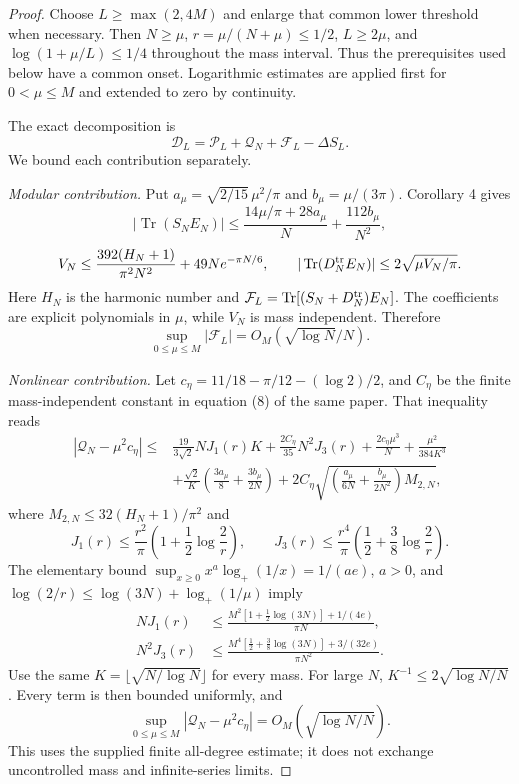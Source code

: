 \documentclass[11pt,a4paper]{article}
\theoremstyle{definition}\newtheorem{definition}[theorem]{Definition}
\begin{document}
\begin{proof}
Choose $L\ge\max(2,4M)$ and enlarge that common lower threshold when necessary. Then $N\ge\mu$, $r=\mu/(N+\mu)\le1/2$, $L\ge2\mu$, and $\log(1+\mu/L)\le1/4$ throughout the mass interval. Thus the prerequisites used below have a common onset. Logarithmic estimates are applied first for $0<\mu\le M$ and extended to zero by continuity.

The exact decomposition is
\[
\mathcal D_L=\mathcal P_L+\mathcal Q_N+\mathcal F_L-\Delta S_L.
\]
We bound each contribution separately.

\emph{Modular contribution.} Put $a_\mu=\sqrt{2/15}\,\mu^2/\pi$ and $b_\mu=\mu/(3\pi)$. Corollary 4 gives
\[
|\operatorname{Tr}(S_NE_N)|\le
\frac{14\mu/\pi+28a_\mu}{N}+\frac{112b_\mu}{N^2},
\]
\[
V_N\le\frac{392(H_N+1)}{\pi^2N^2}+49Ne^{-\pi N/6},\qquad
|\operatorname{Tr}(D_N^{\rm tr}E_N)|\le2\sqrt{\mu V_N/\pi}.
\]
Here $H_N$ is the harmonic number and $\mathcal F_L=\operatorname{Tr}[(S_N+D_N^{\rm tr})E_N]$. The coefficients are explicit polynomials in $\mu$, while $V_N$ is mass independent. Therefore
\[
\sup_{0\le\mu\le M}|\mathcal F_L|=O_M(\sqrt{\log N}/N).
\]

\emph{Nonlinear contribution.} Let $c_\eta=11/18-\pi/12-(\log2)/2$, and $C_\eta$ be the finite mass-independent constant in equation (8) of the same paper. That inequality reads
\begin{align*}
|\mathcal Q_N-\mu^2c_\eta|\le{}&
\frac{19}{3\sqrt2}NJ_1(r)K+\frac{2C_\eta}{35}N^2J_3(r)
+\frac{2c_\eta\mu^3}{N}+\frac{\mu^2}{384K^3}\\
&+\frac{\sqrt2}{K}\left(\frac{3a_\mu}{8}+\frac{3b_\mu}{2N}\right)
+2C_\eta\sqrt{\left(\frac{a_\mu}{6N}+\frac{b_\mu}{2N^2}\right)M_{2,N}},
\end{align*}
where $M_{2,N}\le32(H_N+1)/\pi^2$ and
\[
J_1(r)\le\frac{r^2}{\pi}\left(1+\frac12\log\frac2r\right),\qquad
J_3(r)\le\frac{r^4}{\pi}\left(\frac12+\frac38\log\frac2r\right).
\]
The elementary bound $\sup_{x\ge0}x^a\log_+(1/x)=1/(ae)$, $a>0$, and $\log(2/r)\le\log(3N)+\log_+(1/\mu)$ imply
\begin{align*}
NJ_1(r)&\le\frac{M^2[1+\tfrac12\log(3N)]+1/(4e)}{\pi N},\\
N^2J_3(r)&\le\frac{M^4[\tfrac12+\tfrac38\log(3N)]+3/(32e)}{\pi N^2}.
\end{align*}
Use the same $K=\lfloor\sqrt{N/\log N}\rfloor$ for every mass. For large $N$, $K^{-1}\le2\sqrt{\log N/N}$. Every term is then bounded uniformly, and
\[
\sup_{0\le\mu\le M}|\mathcal Q_N-\mu^2c_\eta|
=O_M(\sqrt{\log N/N}).
\]
This uses the supplied finite all-degree estimate; it does not exchange uncontrolled mass and infinite-series limits.


\end{proof}
\end{document}
